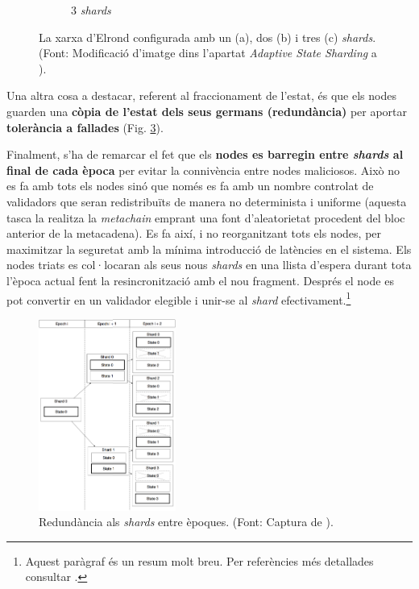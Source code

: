 \documentclass[11pt,a4paper]{article}
\begin{document}
\begin{figure}[h]
\begin{subfigure}[b]{0.55\textwidth}
            \caption[3 \textit{shards}]%
            {{\small 3 \textit{shards}}}    
            \label{fig:sharding01c}
        \end{subfigure}
        \hfill
        \caption[La xarxa d'Elrond configurada amb un (a), dos (b) i tres (c) \textit{shards}.]
        {\small La xarxa d'Elrond configurada amb un (a), dos (b) i tres (c) \textit{shards}. (Font: Modificació d'imatge dins l'apartat \textit{Adaptive State Sharding} a \cite{elrond2022}).} 
        \label{fig:shardingtodo}
\end{figure}

Una altra cosa a destacar, referent al fraccionament de l'estat, és que els nodes guarden una \textbf{còpia de l'estat dels seus germans (redundància)} per aportar \textbf{tolerància a fallades} (Fig. \ref{fig:shardred}).

Finalment, s'ha de remarcar el fet que els \textbf{nodes es barregin entre \textit{shards} al final de cada època} per evitar la connivència entre nodes maliciosos. Això no es fa amb tots els nodes sinó que només es fa amb un nombre controlat de validadors que seran redistribuïts de manera no determinista i uniforme (aquesta tasca la realitza la \textit{metachain} emprant una font d'aleatorietat procedent del bloc anterior de la metacadena). Es fa així, i no reorganitzant tots els nodes, per maximitzar la seguretat amb la mínima introducció de latències en el sistema. Els nodes triats es col·locaran als seus nous \textit{shards} en una llista d'espera durant tota l'època actual fent la resincronització amb el nou fragment. Després el node es pot convertir en un validador elegible i unir-se al \textit{shard} efectivament.\footnote{Aquest paràgraf és un resum molt breu. Per referències més detallades consultar \cite{elrond2019}.}

\begin{figure}[h]
\includegraphics[width=0.4\textwidth]{shardred.png}
\centering
\caption{Redundància als \textit{shards} entre èpoques. (Font: Captura de \cite{elrond2019}).}
\label{fig:shardred}
\end{figure}
\end{document}
